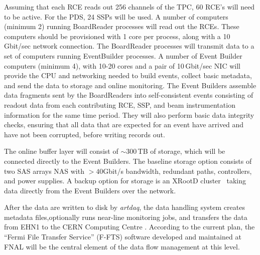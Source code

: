 Assuming that each RCE reads out 256 channels of the TPC, 60 RCE's
will need to be active.  For the PDS, 24 SSPs will be used.  A number
of computers (minimum 2) running BoardReader processes will read out
the RCEs.  These computers should be provisioned with 1 core per process,
along with a 10\,Gbit/sec network connection.  The BoardReader processes
will transmit data to a set of computers running EventBuilder processes.
A number of Event Builder computers (minimum 4), with 10-20 cores and a
pair of 10\,Gbit/sec NIC will provide the CPU and networking needed to
build events, collect basic metadata, and send the data to storage and
online monitoring.  The Event Builders assemble data fragments sent by the
BoardReaders into self-consistent events consisting of readout data from
each contributing RCE, SSP, and beam instrumentation information for the
same time period.  They will also perform basic data integrity checks,
ensuring that all data that are expected for an event have arrived and
have not been corrupted, before writing records out.

The online buffer layer will consist of $\sim$300\,TB of storage,
which will be connected directly to the Event Builders.  The baseline
storage option consists of two SAS arrays NAS with $>40$Gbit/s bandwidth,
redundant paths, controllers, and power supplies.
A backup option for storage is an XRootD cluster~\cite{xrootd} taking
data directly from the Event Builders over the network.




After the data are written to disk by {\it artdaq}, the data handling
system creates metadata files,optionally  runs near-line monitoring jobs, and
transfers the data from EHN1 to the CERN Computing Centre \cite{docdb1212}.
According to the current plan, the ``Fermi File Transfer Service'' (F-FTS) software 
developed and maintained at FNAL will be the central element
of the data flow management at this level.


